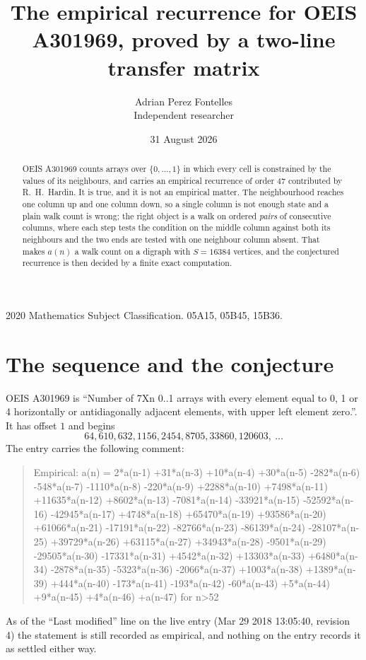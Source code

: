 \documentclass[11pt,a4paper]{article}
\title{The empirical recurrence for OEIS A301969, proved by a two-line transfer matrix}
\author{Adrian Perez Fontelles\\ \small Independent researcher}
\date{31 August 2026}
\theoremstyle{plain}
\theoremstyle{definition}
\begin{document}
\maketitle

\begin{abstract}
OEIS A301969 counts arrays over $\{0,\dots,1\}$ in which every cell is constrained by the
values of its neighbours, and carries an empirical recurrence of order $47$ contributed
by R.~H.~Hardin. It is true, and it is not an empirical matter. The neighbourhood reaches one
column up and one column down, so a single column is not enough state and a plain walk count
is wrong; the right object is a walk on ordered \emph{pairs} of consecutive columns, where
each step tests the condition on the middle column against both its neighbours and the two
ends are tested with one neighbour column absent. That makes $a(n)$ a walk count on a digraph
with $S=16384$ vertices, and the conjectured recurrence is then decided by a finite exact
computation.
\end{abstract}

\noindent\small 2020 Mathematics Subject Classification. 05A15, 05B45, 15B36.\normalsize

\section{The sequence and the conjecture}

OEIS A301969 is ``Number of 7Xn 0..1 arrays with every element equal to 0, 1 or 4 horizontally or antidiagonally adjacent elements, with upper left element zero.''. It has offset $1$ and begins
\[
64, 610, 632, 1156, 2454, 8705, 33860, 120603,\ \dots
\]
The entry carries the following comment:
\begin{quote}\small
Empirical: a(n) = 2*a(n-1) +31*a(n-3) +10*a(n-4) +30*a(n-5) -282*a(n-6) -548*a(n-7) -1110*a(n-8) -220*a(n-9) +2288*a(n-10) +7498*a(n-11) +11635*a(n-12) +8602*a(n-13) -7081*a(n-14) -33921*a(n-15) -52592*a(n-16) -42945*a(n-17) +4748*a(n-18) +65470*a(n-19) +93586*a(n-20) +61066*a(n-21) -17191*a(n-22) -82766*a(n-23) -86139*a(n-24) -28107*a(n-25) +39729*a(n-26) +63115*a(n-27) +34943*a(n-28) -9501*a(n-29) -29505*a(n-30) -17331*a(n-31) +4542*a(n-32) +13303*a(n-33) +6480*a(n-34) -2878*a(n-35) -5323*a(n-36) -2066*a(n-37) +1003*a(n-38) +1389*a(n-39) +444*a(n-40) -173*a(n-41) -193*a(n-42) -60*a(n-43) +5*a(n-44) +9*a(n-45) +4*a(n-46) +a(n-47) for n>52
\end{quote}
As of the ``Last modified'' line on the live entry (Mar 29 2018 13:05:40, revision 4) the statement is
still recorded as empirical, and nothing on the entry records it as settled either way.
\end{document}
